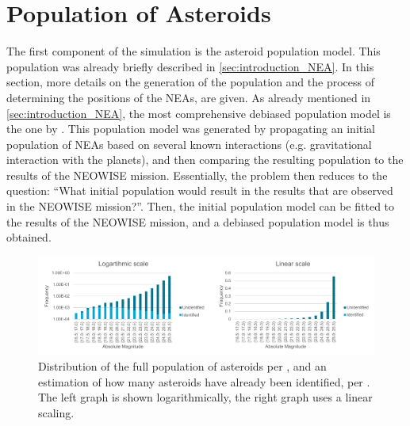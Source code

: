 \section{Population of Asteroids}
\label{sec:modelling_population}
The first component of the simulation is the asteroid population model. This population was already briefly described in \autoref{sec:introduction_NEA}. In this section, more details on the generation of the population and the process of determining the positions of the NEAs, are given. As already mentioned in \autoref{sec:introduction_NEA}, the most comprehensive debiased population model is the one by \cite{GranvikPopulation}. This population model was generated by propagating an initial population of NEAs based on several known interactions (e.g. gravitational interaction with the planets), and then comparing the resulting population to the results of the NEOWISE mission. Essentially, the problem then reduces to the question: ``What initial population would result in the results that are observed in the NEOWISE mission?''. Then, the initial population model can be fitted to the results of the NEOWISE mission, and a debiased population model is thus obtained. \\

\begin{figure}[htbp]
 \centering
 \includegraphics[width=1.0\textwidth]{img/population_identification_correction.pdf}
 \caption{Distribution of the full population of asteroids per \cite{GranvikPopulation}, and an estimation of how many asteroids have already been identified, per \cite{HarrisPopulation}. The left graph is shown logarithmically, the right graph uses a linear scaling.}
 \label{fig:populationcorrection}
\end{figure}


